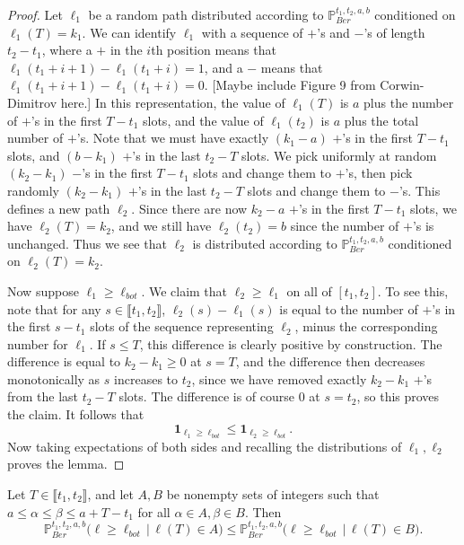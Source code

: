 \begin{proof}
	Let $\ell_1$ be a random path distributed according to $\mathbb{P}^{t_1, t_2, a, b}_{Ber}$ conditioned on $\ell_1(T) = k_1$. We can identify $\ell_1$ with a sequence of $+$'s and $-$'s of length $t_2-t_1$, where a $+$ in the $i$th position means that $\ell_1(t_1+i+1)-\ell_1(t_1+i) = 1$, and a $-$ means that $\ell_1(t_1+i+1)-\ell_1(t_1+i) = 0$. [Maybe include Figure 9 from Corwin-Dimitrov here.] In this representation, the value of $\ell_1(T)$ is $a$ plus the number of $+$'s in the first $T-t_1$ slots, and the value of $\ell_1(t_2)$ is $a$ plus the total number of $+$'s. Note that we must have exactly $(k_1-a)$ $+$'s in the first $T-t_1$ slots, and $(b-k_1)$ $+$'s in the last $t_2-T$ slots. We pick uniformly at random $(k_2-k_1)$ $-$'s in the first $T-t_1$ slots and change them to $+$'s, then pick randomly $(k_2-k_1)$ $+$'s in the last $t_2-T$ slots and change them to $-$'s. This defines a new path $\ell_2$. Since there are now $k_2-a$ $+$'s in the first $T-t_1$ slots, we have $\ell_2(T) = k_2$, and we still have $\ell_2(t_2) = b$ since the number of $+$'s is unchanged. Thus we see that $\ell_2$ is distributed according to $\mathbb{P}^{t_1,t_2,a,b}_{Ber}$ conditioned on $\ell_2(T) = k_2$. 
	
	Now suppose $\ell_1 \geq \ell_{bot}$. We claim that $\ell_2 \geq \ell_1$ on all of $[t_1,t_2]$. To see this, note that for any $s\in\llbracket t_1, t_2\rrbracket$, $\ell_2(s) - \ell_1(s)$ is equal to the number of $+$'s in the first $s-t_1$ slots of the sequence representing $\ell_2$, minus the corresponding number for $\ell_1$. If $s\leq T$, this difference is clearly positive by construction. The difference is equal to $k_2 - k_1 \geq 0$ at $s = T$, and the difference then decreases monotonically as $s$ increases to $t_2$, since we have removed exactly $k_2-k_1$ $+$'s from the last $t_2-T$ slots. The difference is of course 0 at $s = t_2$, so this proves the claim. It follows that
	\[
	\mathbf{1}_{\ell_1 \geq \ell_{bot}} \leq \mathbf{1}_{\ell_2 \geq \ell_{bot}}.
	\]
	Now taking expectations of both sides and recalling the distributions of $\ell_1,\ell_2$ proves the lemma.
\end{proof}


\begin{corollary}\label{setpathcounting}
	Let $T\in\llbracket t_1, t_2\rrbracket$, and let $A, B$ be nonempty sets of integers such that $a \leq \alpha \leq \beta \leq a+T-t_1$ for all $\alpha\in A, \beta\in B$. Then
	\[
	\mathbb{P}^{t_1, t_2, a, b}_{Ber}\big(\ell \geq \ell_{bot}\,\big|\,\ell(T) \in A\big) \leq \mathbb{P}^{t_1, t_2, a, b}_{Ber}\big(\ell \geq \ell_{bot}\,\big|\,\ell(T) \in B\big).
	\]
\end{corollary}

